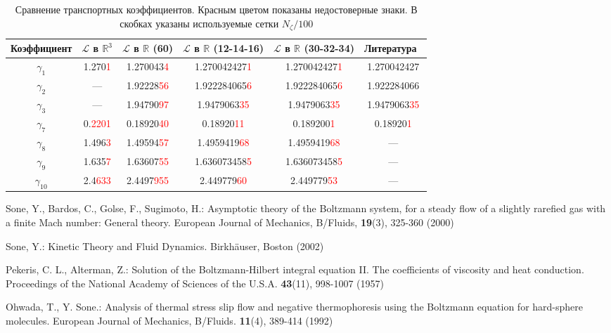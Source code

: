 \documentclass[a4paper,12pt]{article}
\begin{document}
\begin{table}\footnotesize
    \newcommand{\red}[1]{\textcolor{red}{#1}}
    \centering
    \caption{Сравнение транспортных коэффициентов. Красным цветом показаны недостоверные знаки.
        В скобках указаны используемые сетки \(N_\zeta/100\)}
    \label{table:gamma_comparison}
    \begin{tabular}{cccccc}
        Коэффициент    & \(\mathcal{L}\) в \(\mathbb{R}^3\) & \(\mathcal{L}\) в \(\mathbb{R}\) (60)
            & \(\mathcal{L}\) в \(\mathbb{R}\) (12-14-16) & \(\mathcal{L}\) в \(\mathbb{R}\) (30-32-34) & Литература~\cite{Sone2002} \\[3pt]
        \hline\noalign{\smallskip}
        \(\gamma_1\)    & 1.270\red{1} & 1.270043\red{4} & 1.270042427\red{1} & 1.270042427\red{1} & 1.270042427 \\
        \(\gamma_2\)    &     ---      & 1.92228\red{56} & 1.922284065\red{6} & 1.922284065\red{6} & 1.922284066 \\
        \(\gamma_3\)    &     ---      & 1.94790\red{97} & 1.9479063\red{35}  & 1.9479063\red{35}  & 1.9479063\red{35} \\
        \(\gamma_7\)    & 0.\red{2201} & 0.18920\red{40} & 0.18920\red{11}    & 0.189200\red{1}    & 0.18920\red{1} \\
        \(\gamma_8\)    & 1.496\red{3} & 1.49594\red{57} & 1.4959419\red{68}  & 1.4959419\red{68}  & --- \\
        \(\gamma_9\)    & 1.635\red{7} & 1.63607\red{55} & 1.636073458\red{5} & 1.636073458\red{5} & --- \\
        \(\gamma_{10}\) & 2.4\red{633} & 2.4497\red{955} & 2.449779\red{60}   & 2.449779\red{53}   & --- \\
    \end{tabular}
\end{table}

\begin{thebibliography}{9}

    Sone, Y., Bardos, C., Golse, F., Sugimoto, H.:
    Asymptotic theory of the Boltzmann system, for a steady flow of a slightly rarefied gas
    with a finite Mach number: General theory.
    \newblock European Journal of Mechanics, B/Fluids, \textbf{19}(3), 325-360 (2000)

    Sone, Y.: Kinetic Theory and Fluid Dynamics.
    \newblock Birkh{\"a}user, Boston (2002)

    Pekeris, C. L., Alterman, Z.: Solution of the Boltzmann-Hilbert integral equation II.
    The coefficients of viscosity and heat conduction.
    \newblock Proceedings of the National Academy of Sciences of the U.S.A. \textbf{43}(11), 998-1007 (1957)

    Ohwada, T., Y. Sone.: Analysis of thermal stress slip flow and negative thermophoresis
    using the Boltzmann equation for hard-sphere molecules.
    \newblock European Journal of Mechanics, B/Fluids. \textbf{11}(4), 389-414 (1992)

\end{thebibliography}
\end{document}
